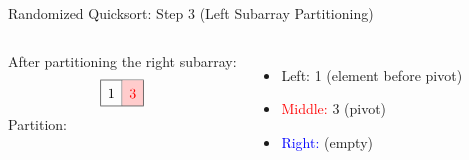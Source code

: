 \begin{frame}[t]{Randomized Quicksort: Step 3 (Left Subarray Partitioning)}
  \begin{columns}[t]
    After partitioning the right subarray:
    \[
      \renewcommand{\arraystretch}{1.5}
      \begin{array}{|c|c|c|}
        \hline
        1 & \cellcolor{red!20}\textcolor{red}{3} \\
        \hline
      \end{array}
    \]
    Partition:
    \begin{itemize}
      \item \textcolor{green!60!black}{Left:} 1 (element before pivot)
      \item \textcolor{red}{Middle:} 3 (pivot)
      \item \textcolor{blue}{Right:} (empty)
    \end{itemize}
    \begin{minipage}[t]{\linewidth}
      \vspace{0pt} %
      \begin{center}


\end{center}
\end{minipage}
\end{columns}
\end{frame}
